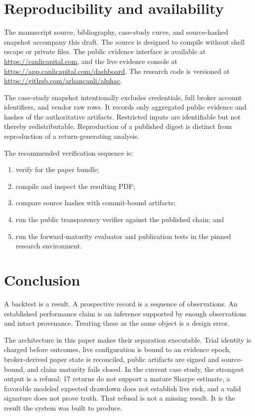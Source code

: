 \documentclass[11pt]{article}
\begin{document}
\section{Reproducibility and availability}

The manuscript source, bibliography, case-study curve, and source-hashed snapshot accompany this draft. The source is designed to compile without shell escape or private files. The public evidence interface is available at \url{https://canlicapital.com}, and the live evidence console at \url{https://app.canlicapital.com/dashboard}. The research code is versioned at \url{https://github.com/arhancanli/alphac}.

The case-study snapshot intentionally excludes credentials, full broker account identifiers, and vendor raw rows. It records only aggregated public evidence and hashes of the authoritative artifacts. Restricted inputs are identifiable but not thereby redistributable. Reproduction of a published digest is distinct from reproduction of a return-generating analysis.

The recommended verification sequence is:

\begin{enumerate}
  \item verify  for the paper bundle;
  \item compile  and inspect the resulting PDF;
  \item compare  source hashes with commit-bound artifacts;
  \item run the public transparency verifier against the published chain; and
  \item run the forward-maturity evaluator and publication tests in the pinned research environment.
\end{enumerate}

\section{Conclusion}

A backtest is a result. A prospective record is a sequence of observations. An established performance claim is an inference supported by enough observations and intact provenance. Treating these as the same object is a design error.

The architecture in this paper makes their separation executable. Trial identity is charged before outcomes, live configuration is bound to an evidence epoch, broker-derived paper state is reconciled, public artifacts are signed and source-bound, and claim maturity fails closed. In the current case study, the strongest output is a refusal: 17 returns do not support a mature Sharpe estimate, a favorable modeled expected drawdown does not establish live risk, and a valid signature does not prove truth. That refusal is not a missing result. It is the result the system was built to produce.
\end{document}
